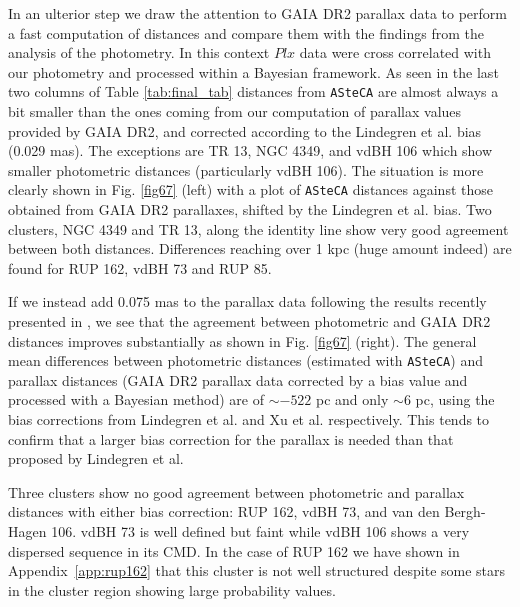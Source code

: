 \documentclass{aa}
\begin{document}
In an ulterior step we draw the attention to GAIA DR2 parallax data to perform a
fast computation of distances and compare them with the findings from the
analysis of the photometry. In this context $Plx$ data were cross correlated
with our photometry and processed within a Bayesian framework.
As seen in the last two columns of Table \ref{tab:final_tab} distances from
\texttt{ASteCA} are almost always a bit smaller than the ones coming
from our computation of parallax values provided by GAIA DR2, and corrected
according to the Lindegren et al. bias (0.029 mas). The exceptions are
TR 13, NGC 4349, and vdBH 106 which show smaller
photometric distances (particularly vdBH 106).
%
The situation is more clearly shown in Fig. \ref{fig67} (left) with a plot of 
\texttt{ASteCA} distances against those obtained from GAIA DR2 parallaxes,
shifted by the Lindegren et al. bias.
%
Two clusters, NGC 4349 and TR 13, along the identity line show very good
agreement between both distances. Differences reaching over 1 kpc (huge amount
indeed) are found for RUP 162, vdBH 73 and RUP 85.

If we instead add 0.075 mas to the parallax data following the results
recently presented in \cite{Xu_2019}, we see that the agreement between
photometric and GAIA DR2 distances improves substantially as shown in Fig. 
\ref{fig67} (right).
%
The general mean differences between photometric distances (estimated with 
\texttt{ASteCA}) and parallax distances (GAIA DR2 parallax data corrected by a
bias value and processed with a Bayesian method) are of $\sim-522$ pc and only
$\sim6$ pc, using the bias corrections from Lindegren et al. and Xu et al.
respectively. This tends to confirm that a larger bias correction for the
parallax is needed than that proposed by Lindegren et al.

Three clusters show no good agreement between photometric and parallax distances
with either bias correction: RUP 162, vdBH 73, and van den
Bergh-Hagen 106. vdBH 73 is well defined but faint while
vdBH 106 shows a very dispersed sequence in its CMD.
In the case of RUP 162 we have shown in Appendix~\ref{app:rup162} that this
cluster is not well structured despite some stars in the cluster region showing
large probability values.
\end{document}
